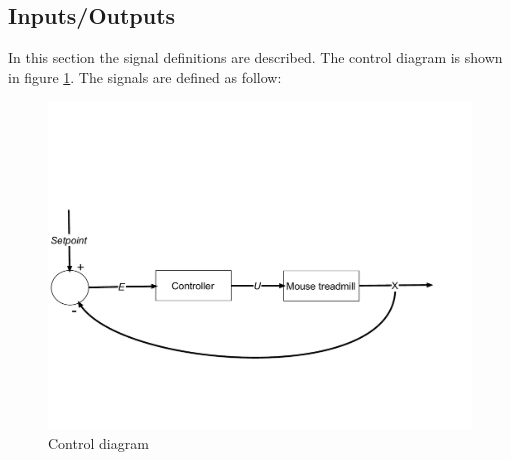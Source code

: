 \documentclass[12pt,a4paper, twoside]{article}
\begin{document}
\subsection{Inputs/Outputs}
In this section the signal definitions are described.
The control diagram is shown in figure \ref{fig:ctrl_diag}. The signals are defined as follow:
\begin{figure}[H]
	\centering
	\includegraphics[width=0.8\linewidth]{fig/ctrl_diag.pdf}
	\caption{Control diagram}\label{fig:ctrl_diag}
\end{figure}
\end{document}
